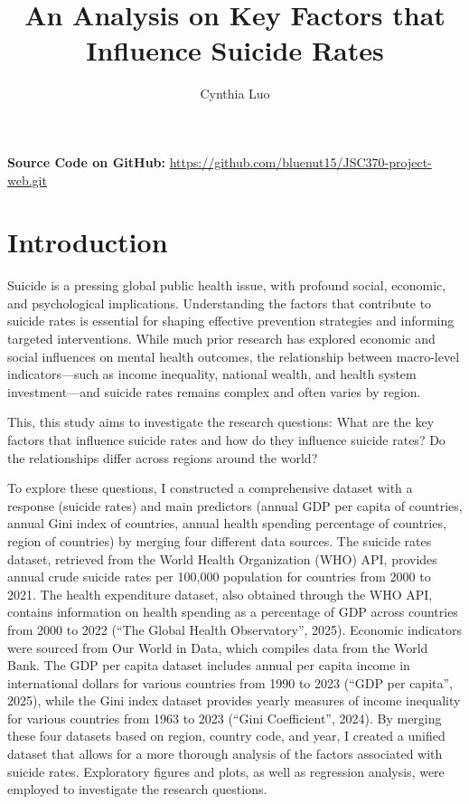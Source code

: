 \documentclass[
]{article}
\title{An Analysis on Key Factors that Influence Suicide Rates}
\author{Cynthia Luo}
\date{}
\begin{document}
\maketitle

\hfill\break

\textbf{Source Code on GitHub:}
\url{https://github.com/bluenut15/JSC370-project-web.git}

\hfill\break

\section{Introduction}\label{introduction}

Suicide is a pressing global public health issue, with profound social,
economic, and psychological implications. Understanding the factors that
contribute to suicide rates is essential for shaping effective
prevention strategies and informing targeted interventions. While much
prior research has explored economic and social influences on mental
health outcomes, the relationship between macro-level indicators---such
as income inequality, national wealth, and health system
investment---and suicide rates remains complex and often varies by
region.

This, this study aims to investigate the research questions: What are
the key factors that influence suicide rates and how do they influence
suicide rates? Do the relationships differ across regions around the
world?

To explore these questions, I constructed a comprehensive dataset with a
response (suicide rates) and main predictors (annual GDP per capita of
countries, annual Gini index of countries, annual health spending
percentage of countries, region of countries) by merging four different
data sources. The suicide rates dataset, retrieved from the World Health
Organization (WHO) API, provides annual crude suicide rates per 100,000
population for countries from 2000 to 2021. The health expenditure
dataset, also obtained through the WHO API, contains information on
health spending as a percentage of GDP across countries from 2000 to
2022 (``The Global Health Observatory'', 2025). Economic indicators were
sourced from Our World in Data, which compiles data from the World Bank.
The GDP per capita dataset includes annual per capita income in
international dollars for various countries from 1990 to 2023 (``GDP per
capita'', 2025), while the Gini index dataset provides yearly measures
of income inequality for various countries from 1963 to 2023 (``Gini
Coefficient'', 2024). By merging these four datasets based on region,
country code, and year, I created a unified dataset that allows for a
more thorough analysis of the factors associated with suicide rates.
Exploratory figures and plots, as well as regression analysis, were
employed to investigate the research questions.
\end{document}
